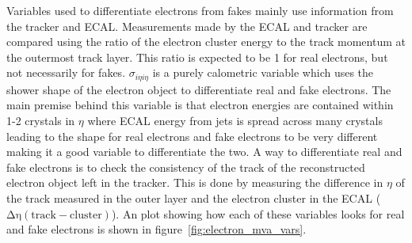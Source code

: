 Variables used to differentiate electrons from fakes mainly use information from the tracker and ECAL.
Measurements made by the ECAL and tracker are compared using the ratio of the electron cluster energy to the track momentum at the outermost track layer.
This ratio is expected to be 1 for real electrons, but not necessarily for fakes.
$\sigma_{i\eta i\eta}$ is a purely calometric variable which uses the shower shape of the electron object to differentiate real and fake electrons.
The main premise behind this variable is that electron energies are contained within 1-2 crystals in $\eta$
where ECAL energy from jets is spread across many crystals leading to the shape for real electrons and fake electrons to be very different making it a good variable to differentiate the two.
A way to differentiate real and fake electrons is to check the consistency of the track of the reconstructed electron object left in the tracker.
This is done by measuring the difference in $\eta$ of the track measured in the outer layer and the electron cluster in the ECAL ($\mathrm{\Delta\eta(track-cluster)}$).
An plot showing how each of these variables looks for real and fake electrons is shown in figure~\ref{fig:electron_mva_vars}.

